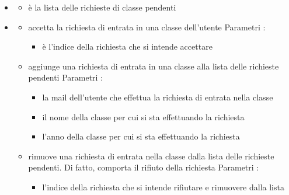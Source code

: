 \begin{itemize}
\item {}
\begin{itemize}
\item {}
\newline
è la lista delle richieste di classe pendenti
\end{itemize}
\item {}
\begin{itemize}
\item {}
\newline
accetta la richiesta di entrata in una classe dell'utente
\newline
Parametri :
\begin{itemize}
\item {}
\newline
è l'indice della richiesta che si intende accettare
\end{itemize}
\item {}
\newline
aggiunge una richiesta di entrata in una classe alla lista delle richieste pendenti
\newline
Parametri :
\begin{itemize}
\item {}
\newline
la mail dell'utente che effettua la richiesta di entrata nella classe
\item {}
\newline
il nome della classe per cui si sta effettuando la richiesta
\item {}
\newline
l'anno della classe per cui si sta effettuando la richiesta
\end{itemize}
\item {}
\newline
rimuove una richiesta di entrata nella classe dalla lista delle richieste pendenti. Di fatto, comporta il rifiuto della richiesta
\newline
Parametri :
\begin{itemize}
\item {}
\newline
l'indice della richiesta che si intende rifiutare e rimuovere dalla lista
\end{itemize}
\end{itemize}
\end{itemize}
